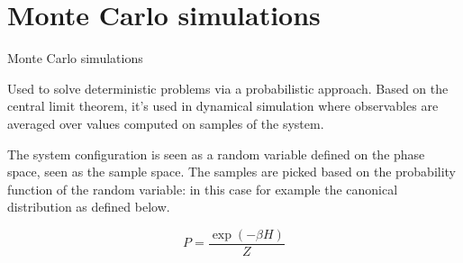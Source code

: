 \documentclass{beamer}
\begin{document}
\section{Monte Carlo simulations}

\begin{frame}{Monte Carlo simulations}

Used to solve deterministic problems via a probabilistic approach. Based on the
central limit theorem, it's used in dynamical simulation where observables are
averaged over values computed on samples of the system.

\vspace{5mm}

The system configuration is seen as a random variable defined on the phase space,
seen as the sample space. The samples are picked based on the probability
function of the random variable: in this case for example the canonical 
distribution as defined below.

\begin{equation}
P = \frac{\exp(-\beta H)}{Z}
\label{eq:canonical}
\end{equation}
\end{frame}
\end{document}
